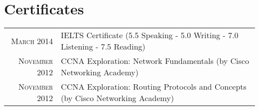 \documentclass[a4paper,10pt]{article} %
\begin{document}

\section{Certificates}

\begin{tabular}{rp{11cm}}
\textsc{March} 2014 & IELTS Certificate \footnotesize(5.5 Speaking - 5.0 Writing - 7.0 Listening - 7.5 Reading)\normalsize\\

\textsc{November} 2012 & CCNA Exploration: Network Fundamentals \footnotesize(by Cisco Networking Academy)\normalsize\\

\textsc{November} 2012 & CCNA Exploration: Routing Protocols and Concepts \footnotesize(by Cisco Networking Academy)\normalsize\\
\end{tabular}

\end{document}
